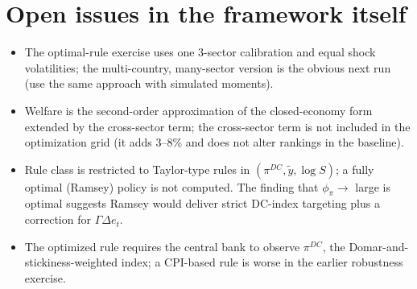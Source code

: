 \documentclass[11pt]{article}
\begin{document}
\section{Open issues in the framework itself}

\begin{itemize}
\item The optimal-rule exercise uses one 3-sector calibration and equal shock volatilities; the multi-country, many-sector version is the obvious
next run (use the same approach with simulated moments).
\item Welfare is the second-order approximation of the closed-economy form extended by the cross-sector term; the cross-sector term is
not included in the optimization grid (it adds $3$--$8$\% and does not alter rankings in the baseline).
\item Rule class is restricted to Taylor-type rules in $(\pi^{DC},\tilde y,\log S)$; a fully optimal (Ramsey) policy is not computed. The finding that
$\phi_\pi\to$ large is optimal suggests Ramsey would deliver strict DC-index targeting plus a correction for $\Gamma\Delta e_t$.
\item The optimized rule requires the central bank to observe $\pi^{DC}$, the Domar-and-stickiness-weighted index; a CPI-based rule is worse
in the earlier robustness exercise.
\end{itemize}
\end{document}

